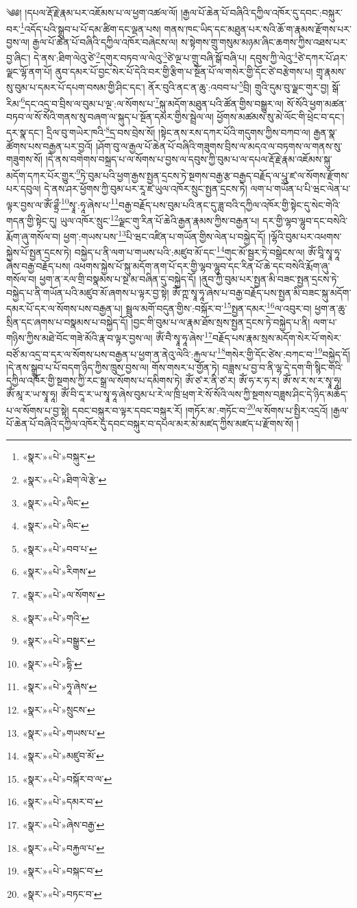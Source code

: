 ༄༅། །དཔལ་རྡོ་རྗེ་རྣམ་པར་འཇོམས་པ་ལ་ཕྱག་འཚལ་ལོ། །རྒྱལ་པོ་ཆེན་པོ་བཞིའི་དཀྱིལ་འཁོར་དུ་དབང་:བསྐུར་བར་\footnote{«སྣར་»«པེ་»བསྐུར་}འདོད་པའི་སྒྲུབ་པ་པོ་དམ་ཚིག་དང་ལྡན་པས། གནས་ཁང་ཡིད་དང་མཐུན་པར་སའི་ཆོ་ག་རྣམས་རྫོགས་པར་བྱས་ལ། རྒྱལ་པོ་ཆེན་པོ་བཞིའི་དཀྱིལ་འཁོར་བཞེངས་ལ། ས་སྟེགས་གྲུ་གསུམ་མཉམ་ཞིང་ཆགས་ཀྱིས་འཐས་པར་བྱ་ཞིང་། དེ་ནས་:ཐིག་ལེའུ་ཙེ་\footnote{«སྣར་»«པེ་»ཐིག་ལེ་རྩེ་}དགུར་བཏབ་ལ་ལེའུ་\footnote{«སྣར་»«པེ་»ལིང་}ཙེ་ལྔ་པ་གྲུ་བཞི་སྒོ་བཞི་པ། དབུས་ཀྱི་ལེའུ་\footnote{«སྣར་»«པེ་»ལིང་}ཙེ་དཀར་པོ་ཤར་ལྗང་ལྷོ་ནག་པོ། ནུབ་དམར་པོ་བྱང་སེར་པོ་དེའི་བར་གྱི་རྩིག་པ་སྔོན་པོ་ལ་གསེར་གྱི་དོང་ཙེ་བརྩེགས་པ། གྲྭ་རྣམས་སུ་བུམ་པ་དམར་པོ་དཔག་བསམ་གྱི་ཤིང་དང་། ནོར་བུའི་ནང་ན་ཆུ་:འབབ་པ་\footnote{«སྣར་»«པེ་»བབ་པ་}བྲི། གྲུའི་དུམ་བུ་ལྗང་གུར་བྱ། སྒོ་རིམ་\footnote{«སྣར་»«པེ་»རིགས་}དང་འདྲ་བ་བྲིས་ལ་བུམ་པ་ལྔ་:ལ་སོགས་པ་\footnote{«སྣར་»«པེ་»ལ་སོགས་}སྐུ་མདོག་མཐུན་པའི་ཚོན་གྱིས་བསྒྱུར་ལ། སོ་སོའི་ཕྱག་མཚན་བཏབ་ལ་སོ་སོའི་གནས་སུ་བཞག་ལ་སྐུད་པ་སྔོན་དམར་གྱིས་སྦྲེལ་ལ། ཕྱོགས་མཚམས་སུ་མེ་ལོང་གི་ཕྲེང་བ་དང་། དར་སྣ་དང་། དྲིལ་བུ་གཡེར་ཁའི་\footnote{«སྣར་»«པེ་»གའི་}དྲ་བས་བྲེས་སོ། །སྟེང་ནས་རས་དཀར་པོའི་གདུགས་ཀྱིས་བཀབ་ལ། རྒྱན་སྣ་ཚོགས་པས་བརྒྱན་པར་བྱའོ། །ཤོག་བུ་ལ་རྒྱལ་པོ་ཆེན་པོ་བཞིའི་གཟུགས་བྲིས་ལ་མདའ་ལ་བཏགས་ལ་གནས་སུ་གཟུགས་སོ། །དེ་ནས་བགེགས་བསྐྲད་པ་ལ་སོགས་པ་བྱས་ལ་དབུས་ཀྱི་བུམ་པ་ལ་དཔལ་རྡོ་རྗེ་རྣམ་འཇོམས་སྐུ་མདོག་དཀར་པོར་གྱུར་\footnote{«སྣར་»«པེ་»བསྒྱུར་}ཏེ་བུམ་པའི་ཕྱག་རྒྱས་སྤྱན་དྲངས་ཏེ་སྔགས་བརྒྱ་རྩ་བརྒྱད་བརྗོད་ལ་པཱུ་ཛ་ལ་སོགས་རྫོགས་པར་དབུལ། དེ་ནས་ཤར་ཕྱོགས་ཀྱི་བུམ་པར་རཱ་ཛ་ཡུལ་འཁོར་སྲུང་སྤྱན་དྲངས་ཏེ། ལག་པ་གཡོན་པ་པི་ཝང་ལེན་པ་ལྟར་བྱས་ལ་ཨོཾ་ཌྷྲྀ་\footnote{«སྣར་»«པེ་»དྷི་}སྭཱ་:ཧཱ་ཞེས་པ་\footnote{«སྣར་»«པེ་»ཧཱ་ཞེས་}བརྒྱ་བརྗོད་པས་བུམ་པའི་ནང་དུ་ཟླ་བའི་དཀྱིལ་འཁོར་གྱི་སྟེང་དུ་སེང་གེའི་གདན་གྱི་སྟེང་དུ། ཡུལ་འཁོར་སྲུང་\footnote{«སྣར་»«པེ་»སྲུངས་}ལྗང་གུ་རིན་པོ་ཆེའི་རྒྱན་རྣམས་ཀྱིས་བརྒྱན་པ། དར་གྱི་ལྷབ་ལྷུབ་དང་བསེའི་རྨོག་ཞུ་གསོལ་བ། ཕྱག་:གཡས་པས་\footnote{«སྣར་»«པེ་»གཡས་པ་}པི་ཝང་འཛིན་པ་གཡོན་གྱིས་ལེན་པ་བསྐྱེད་དོ། །ལྷོའི་བུམ་པར་འཕགས་སྐྱེས་པོ་སྤྱན་དྲངས་ཏེ། བསྐྱེད་པ་ནི་ལག་པ་གཡས་པའི་:མཛུབ་མོ་དང་\footnote{«སྣར་»«པེ་»མཛུབ་མོ་}གུང་མོ་སྦྱར་ཏེ་བསྒྲེངས་ལ། ཨོཾ་བཱི་སྭཱ་ཧཱ་ཞེས་བརྒྱ་བརྗོད་པས། འཕགས་སྐྱེས་པོ་སྐུ་མདོག་ནག་པོ་དར་གྱི་ལྷབ་ལྷུབ་དང་རིན་པོ་ཆེ་དང་བསེའི་རྨོག་ཞུ་གསོལ་བ། ཕྱག་ན་རལ་གྲི་བསྣམས་པ་སྔ་མ་བཞིན་དུ་བསྐྱེད་དོ། །ནུབ་ཀྱི་བུམ་པར་སྤྱན་མི་བཟང་སྤྱན་དྲངས་ཏེ་བསྐྱེད་པ་ནི་གཡོན་པའི་མཛུབ་མོ་ཞགས་པ་ལྟར་བྱ་སྟེ། ཨོཾ་ཀྵ་སྭཱ་ཧཱ་ཞེས་པ་བརྒྱ་བརྗོད་པས་སྤྱན་མི་བཟང་སྐུ་མདོག་དམར་པོ་དར་ལ་སོགས་པས་བརྒྱན་པ། སྦྲུལ་མགོ་བདུན་གྱིས་:བསྐོར་བ་\footnote{«སྣར་»«པེ་»བསྐོར་བ་ལ་}སྤྱན་དམར་\footnote{«སྣར་»«པེ་»དམར་བ་}ལ་འབུར་བ། ཕྱག་ན་ཆུ་སྲིན་དང་ཞགས་པ་བསྣམས་པ་བསྐྱེད་དོ། །བྱང་གི་བུམ་པ་ལ་རྣམ་ཐོས་སྲས་སྤྱན་དྲངས་ཏེ་བསྐྱེད་པ་ནི། ལག་པ་གཉིས་ཀྱིས་མཐེ་བོང་གཟེ་མོའི་རྣ་བ་ལྟར་བྱས་ལ། ཨོཾ་བཻ་སྭཱ་ཧཱ་ཞེས་\footnote{«སྣར་»«པེ་»ཞེས་བརྒྱ་}བརྗོད་པས་རྣམ་སྲས་མདོག་སེར་པོ་གསེར་བཙོ་མ་འདྲ་བ་དར་ལ་སོགས་པས་བརྒྱན་པ་ཕྱག་ན་ནེའུ་ལེའི་:རྐྱལ་པ་\footnote{«སྣར་»«པེ་»བརྐྱལ་པ་}གསེར་གྱི་དོང་ཙེས་:བཀང་བ་\footnote{«སྣར་»«པེ་»བསྐང་བ་}བསྐྱེད་དོ། །དེ་ནས་སྒྲུབ་པ་པོ་བདག་ཉིད་ཀྱིས་ཁྲུས་བྱས་ལ། གོས་གསར་པ་གྱོན་ཏེ། བཟླས་པ་བྱ་བ་ནི་ལྷ་དེ་དག་གི་སྙིང་གའི་དཀྱིལ་འཁོར་གྱི་སྔགས་ཀྱི་རང་སྒྲ་ལ་སོགས་པ་དམིགས་ཏེ། ཨོཾ་ཙ་ར་ནི་ཙ་ར། ཨོཾ་ཧ་ར་ཧ་ར། ཨོཾ་ས་ར་ས་ར་སྭཱ་ཧཱ། ཨོཾ་མཱ་ར་ཡ་སྭཱ་ཧཱ། ཨོཾ་བི་དཱ་ར་ཡ་སྭཱ་ཧཱ་ཞེས་བུམ་པ་རེ་ལ་ཁྲི་ཕྲག་རེ་སོ་སོའི་ལས་ཀྱི་སྔགས་བཟླས་ཤིང་དེ་ཉིད་མཆོད་པ་ལ་སོགས་པ་བྱ་སྟེ། དབང་བསྐུར་བ་ལྟར་དབང་བསྐུར་རོ། །གཏོར་མ་:གཏོང་བ་\footnote{«སྣར་»«པེ་»བཏང་བ་}ལ་སོགས་པ་སྤྱིར་འདྲའོ། །རྒྱལ་པོ་ཆེན་པོ་བཞིའི་དཀྱིལ་འཁོར་དུ་དབང་བསྐུར་བ་དཔལ་མར་མེ་མཛད་ཀྱིས་མཛད་པ་རྫོགས་སོ། ། 